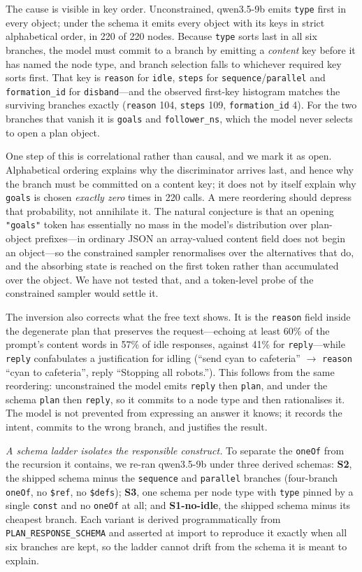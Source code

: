 \documentclass[10pt,twocolumn]{article}
\newcommand{\code}[1]{\texttt{\small #1}}
\begin{document}
The cause is visible in key order. Unconstrained, qwen3.5-9b emits
\code{type} first in every object; under the schema it emits every object with
its keys in strict alphabetical order, in 220 of 220 nodes. Because
\code{type} sorts last in all six branches, the model must commit to a branch
by emitting a \emph{content} key before it has named the node type, and branch
selection falls to whichever required key sorts first. That key is
\code{reason} for \code{idle}, \code{steps} for \code{sequence}/\code{parallel}
and \code{formation\_id} for \code{disband}---and the observed first-key
histogram matches the surviving branches exactly (\code{reason} 104,
\code{steps} 109, \code{formation\_id} 4). For the two branches that vanish it
is \code{goals} and \code{follower\_ns}, which the model never selects to open
a plan object.

One step of this is correlational rather than causal, and we mark it as open.
Alphabetical ordering explains why the discriminator arrives last, and hence
why the branch must be committed on a content key; it does not by itself
explain why \code{goals} is chosen \emph{exactly zero} times in 220 calls.
A mere reordering should depress that probability, not annihilate it. The
natural conjecture is that an opening \code{"goals"} token has essentially no
mass in the model's distribution over plan-object prefixes---in ordinary JSON
an array-valued content field does not begin an object---so the constrained
sampler renormalises over the alternatives that do, and the absorbing state is
reached on the first token rather than accumulated over the object. We have
not tested that, and a token-level probe of the constrained sampler would
settle it.

The inversion also corrects what the free text shows. It is the \code{reason}
field inside the degenerate plan that preserves the request---echoing at least
60\% of the prompt's content words in 57\% of idle responses, against 41\% for
\code{reply}---while \code{reply} confabulates a justification for idling
(``send cyan to cafeteria'' $\to$ \code{reason} ``cyan to cafeteria'', reply
``Stopping all robots.''). This follows from the same reordering: unconstrained
the model emits \code{reply} then \code{plan}, and under the schema
\code{plan} then \code{reply}, so it commits to a node type and then
rationalises it. The model is not prevented from expressing an answer it
knows; it records the intent, commits to the wrong branch, and justifies the
result.

\emph{A schema ladder isolates the responsible construct.} To separate the
\code{oneOf} from the recursion it contains, we re-ran qwen3.5-9b under three
derived schemas: \textbf{S2}, the shipped schema minus the \code{sequence} and
\code{parallel} branches (four-branch \code{oneOf}, no \code{\$ref}, no
\code{\$defs}); \textbf{S3}, one schema per node type with \code{type} pinned
by a single \code{const} and no \code{oneOf} at all; and \textbf{S1-no-idle},
the shipped schema minus its cheapest branch. Each variant is derived
programmatically from \code{PLAN\_RESPONSE\_SCHEMA} and asserted at import to
reproduce it exactly when all six branches are kept, so the ladder cannot
drift from the schema it is meant to explain.
\end{document}
